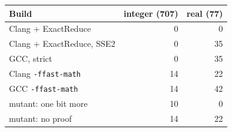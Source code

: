 \begin{tabular}{lrr}
\toprule
Build & integer (707) & real (77)\\
\midrule
Clang + ExactReduce & 0 & 0\\
Clang + ExactReduce, SSE2 & 0 & 35\\
GCC, strict & 0 & 35\\
Clang \texttt{-ffast-math} & 14 & 22\\
GCC \texttt{-ffast-math} & 14 & 42\\
mutant: one bit more & 10 & 0\\
mutant: no proof & 14 & 22\\
\bottomrule
\end{tabular}
